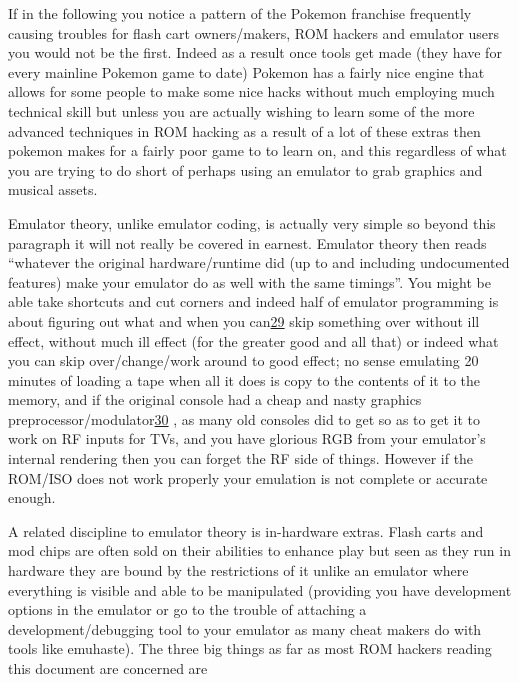 \documentclass[
]{book}
\begin{document}
If in the following you notice a pattern of the Pokemon franchise frequently causing troubles for flash cart owners/makers, ROM hackers and emulator users you would not be the first. Indeed as a result once tools get made (they have for every mainline Pokemon game to date) Pokemon has a fairly nice engine that allows for some people to make some nice hacks without much employing much technical skill but unless you are actually wishing to learn some of the more advanced techniques in ROM hacking as a result of a lot of these extras then pokemon makes for a fairly poor game to to learn on, and this regardless of what you are trying to do short of perhaps using an emulator to grab graphics and musical assets.

Emulator theory, unlike emulator coding, is actually very simple so beyond this paragraph it will not really be covered in earnest. Emulator theory then reads ``whatever the original hardware/runtime did (up to and including undocumented features) make your emulator do as well with the same timings''. You might be able take shortcuts and cut corners and indeed half of emulator programming is about figuring out what and when you can\href{romhacking202030.html\#fn29x0}{29} skip something over without ill effect, without much ill effect (for the greater good and all that) or indeed what you can skip over/change/work around to good effect; no sense emulating 20 minutes of loading a tape when all it does is copy to the contents of it to the memory, and if the original console had a cheap and nasty graphics preprocessor/modulator\href{romhacking202031.html\#fn30x0}{30} , as many old consoles did to get so as to get it to work on RF inputs for TVs, and you have glorious RGB from your emulator's internal rendering then you can forget the RF side of things. However if the ROM/ISO does not work properly your emulation is not complete or accurate enough.

A related discipline to emulator theory is in-hardware extras. Flash carts and mod chips are often sold on their abilities to enhance play but seen as they run in hardware they are bound by the restrictions of it unlike an emulator where everything is visible and able to be manipulated (providing you have development options in the emulator or go to the trouble of attaching a development/debugging tool to your emulator as many cheat makers do with tools like emuhaste). The three big things as far as most ROM hackers reading this document are concerned are
\end{document}
